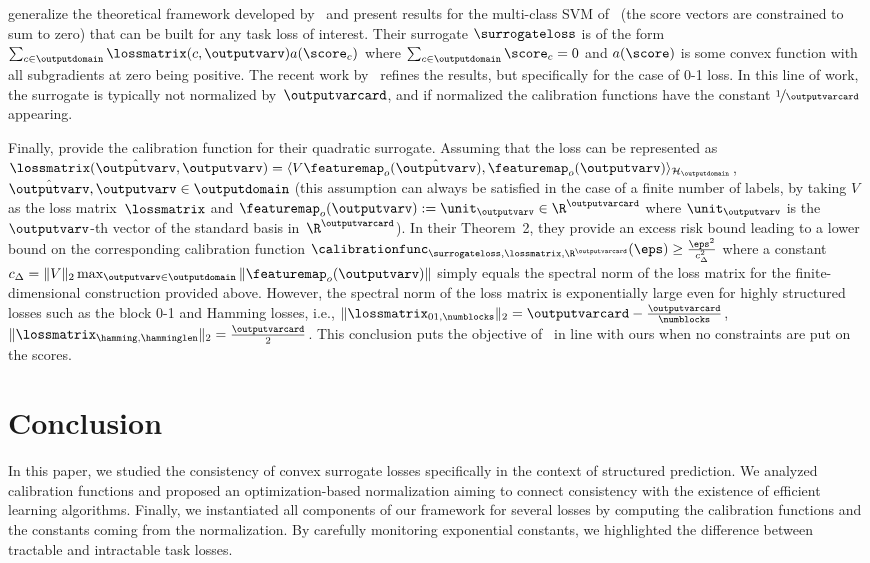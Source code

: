 \documentclass{article}
\begin{document}
\citet{pires2013riskbounds} generalize the theoretical framework developed by~\citet{steinwart07}  and present results for the multi-class SVM of~\citet{lee2004multicategory} (the score vectors are constrained to sum to zero) that can be built for any task loss of interest.
Their surrogate $\surrogateloss$ is of the form $\sum_{c \in \outputdomain} \lossmatrix(c, \outputvarv) a( \score_c )$ where $\sum_{c \in \outputdomain} \score_c = 0$ and $a(\score)$ is some convex function with all subgradients at zero being positive.
The recent work by~\citet{pires2016calfuncs} refines the results, but specifically for the case of 0-1 loss.
In this line of work, the surrogate is typically not normalized by~$\outputvarcard$, and if normalized the calibration functions have the constant $\nicefrac{1}{\outputvarcard}$ appearing.

Finally, \citet{ciliberto16} provide the calibration function for their quadratic surrogate.
Assuming that the loss can be represented as
$
\lossmatrix(\hat{\outputvarv}, \outputvarv) = \langle V \featuremap_o(\hat{\outputvarv}), \featuremap_o(\outputvarv) \rangle_{\mathcal{H}_\outputdomain}
$, $\hat{\outputvarv}, \outputvarv \in \outputdomain$
(this assumption can always be satisfied in the case of a finite number of labels, by taking $V$ as the loss matrix~$\lossmatrix$ and $\featuremap_o(\outputvarv) := \unit_\outputvarv \in \R^\outputvarcard$ where $\unit_\outputvarv$ is the $\outputvarv$-th vector of the standard basis in~$\R^{\outputvarcard}$).
In their Theorem~2, they provide an excess risk bound leading to a lower bound on the corresponding calibration function
$
\calibrationfunc_{\surrogateloss,\lossmatrix,\R^{\outputvarcard}}(\eps) \geq \frac{\eps^2}{c_\Delta^2}
$
where a constant $c_\Delta = \|V\|_2 \max_{\outputvarv \in \outputdomain} \|\featuremap_o(\outputvarv)\|$ simply equals the spectral norm of the loss matrix for the finite-dimensional construction provided above.
However, the spectral norm of the loss matrix is exponentially large even for highly structured losses such as the block 0-1 and Hamming losses, i.e.,
$\|\lossmatrix_{01,\numblocks}\|_2 = \outputvarcard - \frac{\outputvarcard}{\numblocks}$,
$\|\lossmatrix_{\hamming,\hamminglen}\|_2 = \frac{\outputvarcard}{2}$.
This conclusion puts the objective of~\citet{ciliberto16} in line with ours when no constraints are put on the scores.

\section{Conclusion}
\label{sec:conclusion}
In this paper, we studied the consistency of convex surrogate losses specifically in the context of structured prediction.
We analyzed calibration functions and proposed an optimization-based normalization aiming to connect consistency with the existence of efficient learning algorithms.
Finally, we instantiated all components of our framework for several losses by computing the calibration functions and the constants coming from the normalization.
By carefully monitoring exponential constants, we highlighted the difference between tractable and intractable task losses.
\end{document}
